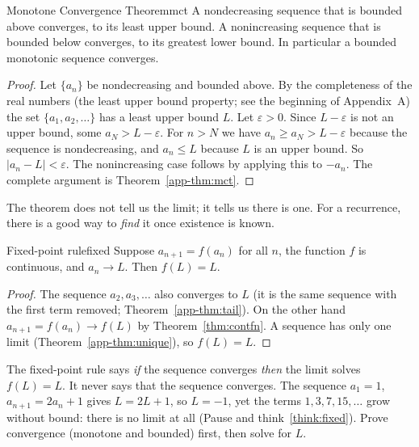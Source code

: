 \documentclass[11pt]{article}
\begin{document}
\begin{thm}{Monotone Convergence Theorem}{mct}
A nondecreasing sequence that is bounded above converges, to its least upper bound. A nonincreasing sequence that is bounded below converges, to its greatest lower bound. In particular a bounded monotonic sequence converges.
\end{thm}
\begin{proof}
Let $\{a_n\}$ be nondecreasing and bounded above. By the completeness of the real numbers (the least upper bound property; see the beginning of Appendix~A) the set $\{a_1,a_2,\dots\}$ has a least upper bound $L$. Let $\varepsilon>0$. Since $L-\varepsilon$ is not an upper bound, some $a_N>L-\varepsilon$. For $n>N$ we have $a_n\ge a_N>L-\varepsilon$ because the sequence is nondecreasing, and $a_n\le L$ because $L$ is an upper bound. So $|a_n-L|<\varepsilon$. The nonincreasing case follows by applying this to $-a_n$. The complete argument is Theorem~\ref{app-thm:mct}.
\end{proof}

The theorem does not tell us the limit; it tells us there is one. For a recurrence, there is a good way to \emph{find} it once existence is known.

\begin{thm}{Fixed-point rule}{fixed}
Suppose $a_{n+1}=f(a_n)$ for all $n$, the function $f$ is continuous, and $a_n\to L$. Then $f(L)=L$.
\end{thm}
\begin{proof}
The sequence $a_2,a_3,\dots$ also converges to $L$ (it is the same sequence with the first term removed; Theorem~\ref{app-thm:tail}). On the other hand $a_{n+1}=f(a_n)\to f(L)$ by Theorem~\ref{thm:contfn}. A sequence has only one limit (Theorem~\ref{app-thm:unique}), so $f(L)=L$.
\end{proof}

\begin{warn}
The fixed-point rule says \emph{if} the sequence converges \emph{then} the limit solves $f(L)=L$. It never says that the sequence converges. The sequence $a_1=1$, $a_{n+1}=2a_n+1$ gives $L=2L+1$, so $L=-1$, yet the terms $1,3,7,15,\dots$ grow without bound: there is no limit at all (Pause and think~\ref{think:fixed}). Prove convergence (monotone and bounded) first, then solve for $L$.
\end{warn}
\end{document}

